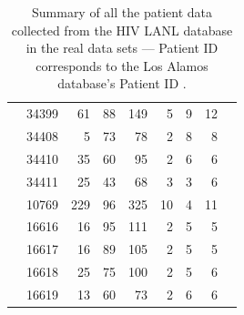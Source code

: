 \documentclass[12pt]{article}
\begin{document}
\begin{table}[!ht]
\begin{center}
\begin{tabular}{llrrrrrrr}
& 34399 &      61 &       88 &      149 &        5 &        9 &       12 \\
& 34408 &       5 &       73 &       78 &        2 &        8 &        8 \\
& 34410 &      35 &       60 &       95 &        2 &        6 &        6 \\
& 34411 &      25 &       43 &       68 &        3 &        3 &        6   \\
\cite{Fischer04} & 10769 &    229 &       96 &      325 &       10 &        4 &       11 \\ 
\cite{Llewellyn06} & 16616 &     16 &       95 &      111 &        2 &        5 &        5 \\
& 16617 &     16 &       89 &      105 &        2 &        5 &        5 \\
& 16618 &     25 &       75 &      100 &        2 &        5 &        6 \\
& 16619 &     13 &       60 &       73 &        2 &        6 &        6 \\
\hline
\end{tabular}
\end{center}
  \caption{Summary of all the patient data collected from the HIV LANL database in the real data sets --- Patient ID corresponds to the Los Alamos database's Patient ID \citep{LosAlamos}.
   }\label{tab:patients} 
\end{table}
\end{document}
